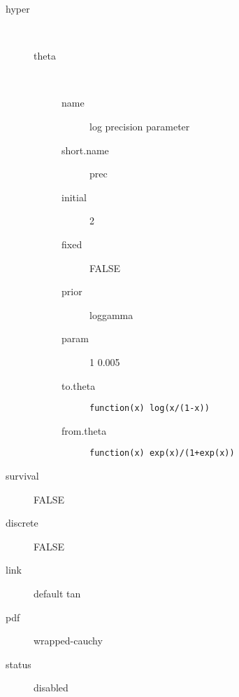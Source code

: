 \begin{description}
	\item[hyper]\ 
	 \begin{description}
	 	\item[theta]\ 
	 	 \begin{description}
	 	 	\item[name] log precision parameter
	 	 	\item[short.name] prec
	 	 	\item[initial] 2
	 	 	\item[fixed] FALSE
	 	 	\item[prior] loggamma
	 	 	\item[param] 1 0.005
	 	 	\item[to.theta] \verb|function(x) log(x/(1-x))|
	 	 	\item[from.theta] \verb|function(x) exp(x)/(1+exp(x))|
	 	 \end{description}
	 \end{description}
	\item[survival] FALSE
	\item[discrete] FALSE
	\item[link] default tan
	\item[pdf] wrapped-cauchy
	\item[status] disabled
\end{description}
